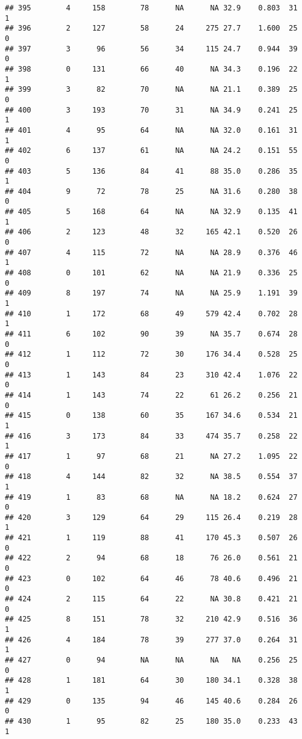 \documentclass[
]{article}
\begin{document}
\begin{verbatim}
## 395        4     158        78      NA      NA 32.9    0.803  31    1
## 396        2     127        58      24     275 27.7    1.600  25    0
## 397        3      96        56      34     115 24.7    0.944  39    0
## 398        0     131        66      40      NA 34.3    0.196  22    1
## 399        3      82        70      NA      NA 21.1    0.389  25    0
## 400        3     193        70      31      NA 34.9    0.241  25    1
## 401        4      95        64      NA      NA 32.0    0.161  31    1
## 402        6     137        61      NA      NA 24.2    0.151  55    0
## 403        5     136        84      41      88 35.0    0.286  35    1
## 404        9      72        78      25      NA 31.6    0.280  38    0
## 405        5     168        64      NA      NA 32.9    0.135  41    1
## 406        2     123        48      32     165 42.1    0.520  26    0
## 407        4     115        72      NA      NA 28.9    0.376  46    1
## 408        0     101        62      NA      NA 21.9    0.336  25    0
## 409        8     197        74      NA      NA 25.9    1.191  39    1
## 410        1     172        68      49     579 42.4    0.702  28    1
## 411        6     102        90      39      NA 35.7    0.674  28    0
## 412        1     112        72      30     176 34.4    0.528  25    0
## 413        1     143        84      23     310 42.4    1.076  22    0
## 414        1     143        74      22      61 26.2    0.256  21    0
## 415        0     138        60      35     167 34.6    0.534  21    1
## 416        3     173        84      33     474 35.7    0.258  22    1
## 417        1      97        68      21      NA 27.2    1.095  22    0
## 418        4     144        82      32      NA 38.5    0.554  37    1
## 419        1      83        68      NA      NA 18.2    0.624  27    0
## 420        3     129        64      29     115 26.4    0.219  28    1
## 421        1     119        88      41     170 45.3    0.507  26    0
## 422        2      94        68      18      76 26.0    0.561  21    0
## 423        0     102        64      46      78 40.6    0.496  21    0
## 424        2     115        64      22      NA 30.8    0.421  21    0
## 425        8     151        78      32     210 42.9    0.516  36    1
## 426        4     184        78      39     277 37.0    0.264  31    1
## 427        0      94        NA      NA      NA   NA    0.256  25    0
## 428        1     181        64      30     180 34.1    0.328  38    1
## 429        0     135        94      46     145 40.6    0.284  26    0
## 430        1      95        82      25     180 35.0    0.233  43    1

\end{verbatim}
\end{document}
